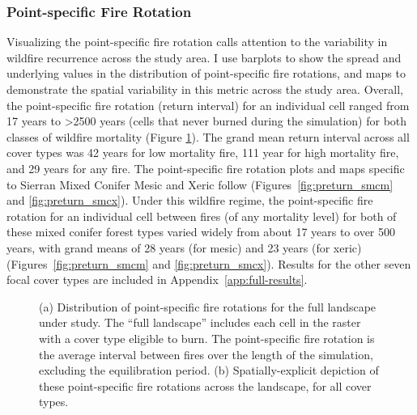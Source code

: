 \subsubsection{Point-specific Fire Rotation}
Visualizing the point-specific fire rotation calls attention to the variability in wildfire recurrence across the study area. I use barplots to show the spread and underlying values in the distribution of point-specific fire rotations, and maps to demonstrate the spatial variability in this metric across the study area. Overall, the point-specific fire rotation (return interval) for an individual cell ranged from 17 years to \textgreater 2500 years (cells that never burned during the simulation) for both classes of wildfire mortality (Figure \ref{fig:preturn}). The grand mean return interval across all cover types was 42 years for low mortality fire, 111 year for high mortality fire, and 29 years for any fire. The point-specific fire rotation plots and maps specific to Sierran Mixed Conifer Mesic and Xeric follow (Figures~\ref{fig:preturn_smcm} and \ref{fig:preturn_smcx}). Under this wildfire regime, the point-specific fire rotation for an individual cell between fires (of any mortality level) for both of these mixed conifer forest types varied widely from about 17 years to over 500 years, with grand means of 28 years (for mesic) and 23 years (for xeric) (Figures~\ref{fig:preturn_smcm} and \ref{fig:preturn_smcx}). Results for the other seven focal cover types are included in Appendix~\ref{app:full-results}. 



\begin{figure}[!htbp]
  \centering
  \qquad
  \caption{(a) Distribution of point-specific fire rotations for the full landscape under study. The ``full landscape'' includes each cell in the raster with a cover type eligible to burn. The point-specific fire rotation is the average interval between fires over the length of the simulation, excluding the equilibration period. (b) Spatially-explicit depiction of these point-specific fire rotations across the landscape, for all cover types.}
  \label{fig:preturn}
\end{figure}

